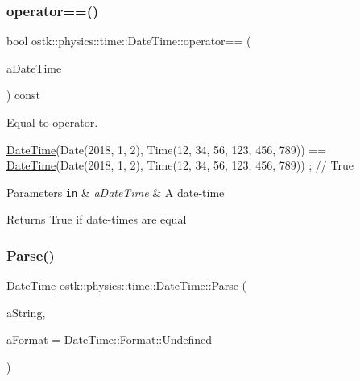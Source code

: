 \subsubsection{\texorpdfstring{operator==()}{operator==()}}
{\footnotesize\ttfamily bool ostk\+::physics\+::time\+::\+Date\+Time\+::operator== (\begin{DoxyParamCaption}\item[{const \hyperlink{classostk_1_1physics_1_1time_1_1_date_time}{Date\+Time} \&}]{a\+Date\+Time }\end{DoxyParamCaption}) const}



Equal to operator. 


\begin{DoxyCode}
\hyperlink{classostk_1_1physics_1_1time_1_1_date_time_a974b5a7581ae7461ccf0e6ab85e42633}{DateTime}(Date(2018, 1, 2), Time(12, 34, 56, 123, 456, 789)) == \hyperlink{classostk_1_1physics_1_1time_1_1_date_time_a974b5a7581ae7461ccf0e6ab85e42633}{DateTime}(Date(2018, 1, 2), 
      Time(12, 34, 56, 123, 456, 789)) ; \textcolor{comment}{// True}
\end{DoxyCode}



\begin{DoxyParams}[1]{Parameters}
\mbox{\tt in}  & {\em a\+Date\+Time} & A date-\/time \\
\hline
\end{DoxyParams}
\begin{DoxyReturn}{Returns}
True if date-\/times are equal 
\end{DoxyReturn}
\mbox{\label{classostk_1_1physics_1_1time_1_1_date_time_a63137170ace92a8525af219e03cba573}} 
\subsubsection{\texorpdfstring{Parse()}{Parse()}}
{\footnotesize\ttfamily \hyperlink{classostk_1_1physics_1_1time_1_1_date_time}{Date\+Time} ostk\+::physics\+::time\+::\+Date\+Time\+::\+Parse (\begin{DoxyParamCaption}\item[{const String \&}]{a\+String,  }\item[{const \hyperlink{classostk_1_1physics_1_1time_1_1_date_time_a1d21d982b18bf56ed684fcf1cd97e092}{Date\+Time\+::\+Format} \&}]{a\+Format = {\ttfamily \hyperlink{classostk_1_1physics_1_1time_1_1_date_time_a1d21d982b18bf56ed684fcf1cd97e092aec0fc0100c4fc1ce4eea230c3dc10360}{Date\+Time\+::\+Format\+::\+Undefined}} }\end{DoxyParamCaption})\hspace{0.3cm}{\ttfamily [static]}}



